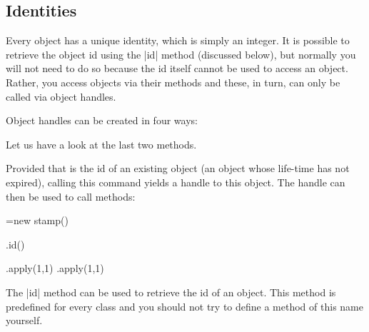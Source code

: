 \subsection{Identities}
\label{section-identities}

Every object has a unique identity, which is simply an integer. It is
possible to retrieve the object id using the |id| method (discussed
below), but normally you will not need to do so because the id itself
cannot be used to access an object. Rather, you access objects via
their methods and these, in turn, can only be called via object
handles. 

Object handles can be created in four ways:

Let us have a look at the last two methods.

\begin{command}{\pgfooobj{}}
  Provided that  is the id of an existing object (an object
  whose life-time has not expired), calling this command yields a
  handle to this object. The handle can then be used to call methods:
\begin{codeexample}
\pgfoonew \mystamp=new stamp()

\mystamp.id(\myid)

\mystamp.apply(1,1)
\pgfooobj{\myid}.apply(1,1)
\end{codeexample}
\end{command}

The |id| method can be used to retrieve the id of an object. This
method is predefined for every class and you should not try to define
a method of this name yourself.

